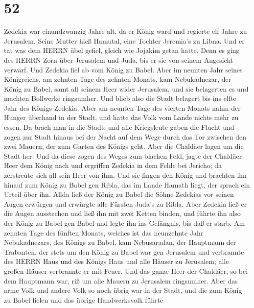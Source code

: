 \hypertarget{section-51}{%
\section{52}\label{section-51}}

 Zedekia war einundzwanzig Jahre alt, da er König ward und
regierte elf Jahre zu Jerusalem. Seine Mutter hieß Hamutal, eine Tochter
Jeremia's zu Libna.  Und er tat was dem HERRN übel gefiel,
gleich wie Jojakim getan hatte.  Denn es ging des HERRN Zorn
über Jerusalem und Juda, bis er sie von seinem Angesicht verwarf. Und
Zedekia fiel ab vom König zu Babel.  Aber im neunten Jahr
seines Königreichs, am zehnten Tage des zehnten Monats, kam
Nebukadnezar, der König zu Babel, samt all seinem Heer wider Jerusalem,
und sie belagerten es und machten Bollwerke ringsumher.  Und
blieb also die Stadt belagert bis ins elfte Jahr des Königs Zedekia.
 Aber am neunten Tage des vierten Monats nahm der Hunger
überhand in der Stadt, und hatte das Volk vom Lande nichts mehr zu
essen.  Da brach man in die Stadt; und alle Kriegsleute
gaben die Flucht und zogen zur Stadt hinaus bei der Nacht auf dem Wege
durch das Tor zwischen den zwei Mauern, der zum Garten des Königs geht.
Aber die Chaldäer lagen um die Stadt her.  Und da diese
zogen des Weges zum blachen Feld, jagte der Chaldäer Heer dem König nach
und ergriffen Zedekia in dem Felde bei Jericho; da zerstreute sich all
sein Heer von ihm.  Und sie fingen den König und brachten
ihn hinauf zum König zu Babel gen Ribla, das im Lande Hamath liegt, der
sprach ein Urteil über ihn.  Allda ließ der König zu Babel
die Söhne Zedekias vor seinen Augen erwürgen und erwürgte alle Fürsten
Juda's zu Ribla.  Aber Zedekia ließ er die Augen ausstechen
und ließ ihn mit zwei Ketten binden, und führte ihn also der König zu
Babel gen Babel und legte ihn ins Gefängnis, bis daß er starb.
 Am zehnten Tage des fünften Monats, welches ist das
neunzehnte Jahr Nebukadnezars, des Königs zu Babel, kam Nebusaradan, der
Hauptmann der Trabanten, der stets um den König zu Babel war gen
Jerusalem  und verbrannte des HERRN Haus und des Königs
Haus und alle Häuser zu Jerusalem; alle großen Häuser verbrannte er mit
Feuer.  Und das ganze Heer der Chaldäer, so bei dem
Hauptmann war, riß um alle Mauern zu Jerusalem ringsumher. 
Aber das arme Volk und andere Volk so noch übrig war in der Stadt, und
die zum König zu Babel fielen und das übrige Handwerksvolk führte

